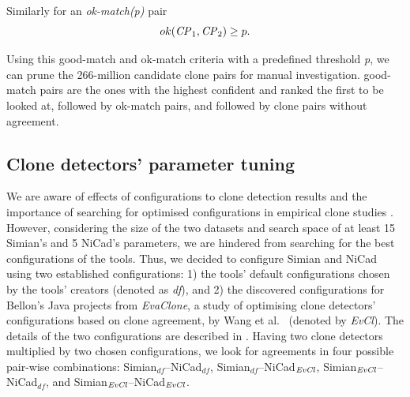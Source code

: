 \documentclass{sig-alternate-05-2015}
\newcommand{\squeezeup}{\vspace{-0.5mm}}
\begin{document}
Similarly for an \textit{ok-match(p)} pair
\begin{equation}
ok(\textrm{\textit{CP}}_1,\textrm{\textit{CP}}_2) \geq p.
\end{equation}

Using this good-match and ok-match criteria with a predefined threshold \textit{p}, we can prune the 266-million candidate clone pairs for manual investigation. good-match pairs are the ones with the highest confident and ranked the first to be looked at, followed by ok-match pairs, and followed by clone pairs without agreement.

\subsection{Clone detectors' parameter tuning}
We are aware of effects of configurations to clone detection results and the importance of searching for optimised configurations in empirical clone studies \cite{Wang2013,cr2016ssbse,Ragkhitwetsagul2016,Svajlenko2014}. However, considering the size of the two datasets and search space of at least 15 Simian's and 5 NiCad's parameters, we are hindered from searching for the best configurations of the tools. Thus, we decided to configure Simian and NiCad using two established configurations: 1) the tools' default configurations chosen by the tools' creators (denoted as \textit{df}), and 2) the discovered configurations for Bellon's Java projects from \textit{EvaClone}, a study of optimising clone detectors' configurations based on clone agreement, by Wang et al.~\cite{Wang2013} (denoted by \textit{EvCl}). The details of the two configurations are described in . Having two clone detectors multiplied by two chosen configurations, we look for agreements in four possible pair-wise combinations: Simian$_{df}$--NiCad$_{df}$, Simian$_{df}$--NiCad$_{\textrm{\textit{EvCl}}}$, Simian$_{\textrm{\textit{EvCl}}}$--NiCad$_{df}$, and Simian$_{\textrm{\textit{EvCl}}}$--NiCad$_{\textrm{\textit{EvCl}}}$.
\end{document}
